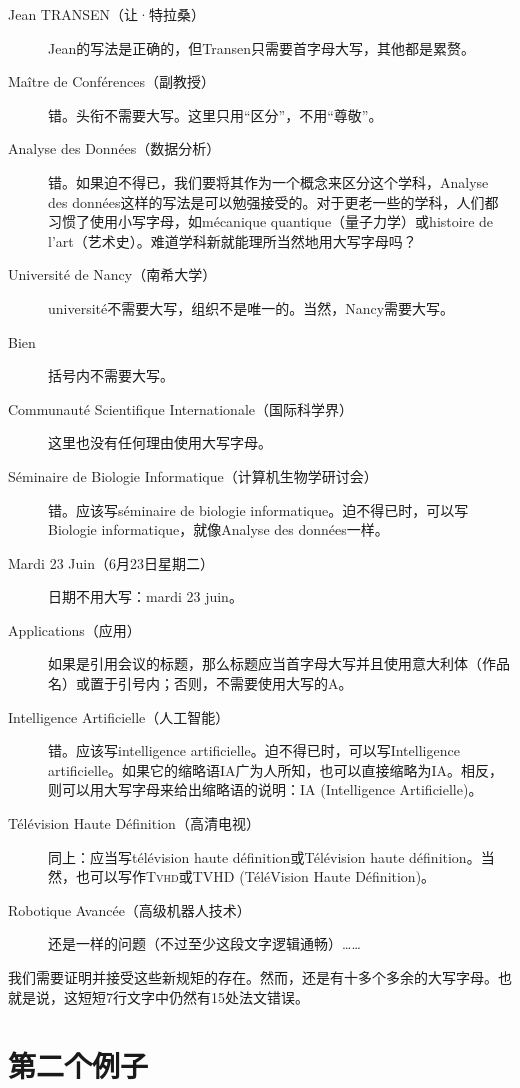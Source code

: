 \begin{description}
    \item[Jean TRANSEN（让·特拉桑）] Jean的写法是正确的，但Transen只需要首字母大写，其他都是累赘。
    \item[Maître de Conférences（副教授）] 错。头衔不需要大写。这里只用``区分''，不用``尊敬''。
    \item[Analyse des Données（数据分析）] 错。如果迫不得已，我们要将其作为一个概念来区分这个学科，Analyse des données这样的写法是可以勉强接受的。对于更老一些的学科，人们都习惯了使用小写字母，如mécanique quantique（量子力学）或histoire de l'art（艺术史）。难道学科新就能理所当然地用大写字母吗？
    \item[Université de Nancy（南希大学）] université不需要大写，组织不是唯一的。当然，Nancy需要大写。
    \item[Bien] 括号内不需要大写。
    \item[Communauté Scientifique Internationale（国际科学界）] 这里也没有任何理由使用大写字母。
    \item[Séminaire de Biologie Informatique（计算机生物学研讨会）] 错。应该写séminaire de biologie informatique。迫不得已时，可以写Biologie informatique，就像Analyse des données一样。
    \item[Mardi 23 Juin（6月23日星期二）] 日期不用大写：mardi 23 juin。
    \item[Applications（应用）] 如果是引用会议的标题，那么标题应当首字母大写并且使用意大利体（作品名）或置于引号内；否则，不需要使用大写的A。
    \item[Intelligence Artificielle（人工智能）] 错。应该写intelligence artificielle。迫不得已时，可以写Intelligence artificielle。如果它的缩略语IA广为人所知，也可以直接缩略为IA。相反，则可以用大写字母来给出缩略语的说明：IA (Intelligence Artificielle)。
    \item[Télévision Haute Définition（高清电视）] 同上：应当写télévision haute définition或Télévision haute définition。当然，也可以写作\textsc{Tvhd}或TVHD (TéléVision Haute Définition)。
    \item[Robotique Avancée（高级机器人技术）] 还是一样的问题（不过至少这段文字逻辑通畅）……
\end{description}

我们需要证明并接受这些新规矩的存在。然而，还是有十多个多余的大写字母。也就是说，这短短7行文字中仍然有15处法文错误。

\section{第二个例子}

